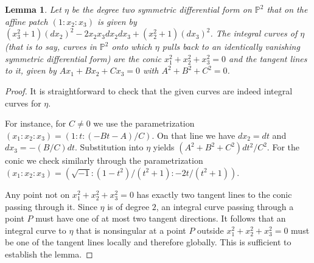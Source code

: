 \documentclass[12pt, reqno]{amsart}
\newtheorem{lemma}{Lemma}[section]
\theoremstyle{definition}
\newcommand{\PP}{{\mathbb P}}
\numberwithin{equation}{section}
\numberwithin{table}{section}
\begin{document}
\begin{lemma}\label{L:integral_curve_classification_on_P2}
	Let $\eta$ be the degree two symmetric differential form on $\PP^2$ that on the affine patch $(1:x_2:x_3)$ is given by $(x_3^2+1)(dx_2)^2-2x_2x_3dx_2dx_3+(x_2^2+1)(dx_3)^2$. The integral curves of $\eta$ (that is to say, curves in $\PP^2$ onto which $\eta$ pulls back to an identically vanishing symmetric differential form) are the conic $x_1^2+x_2^2+x_3^2=0$ and the tangent lines to it, given by $Ax_1+Bx_2+Cx_3=0$ with $A^2+B^2+C^2=0$.
\end{lemma}
\begin{proof}
	It is straightforward to check that the given curves are indeed integral curves for $\eta$.
	
	For instance, for $C\neq 0$ we use the parametrization $(x_1:x_2:x_3)=(1:t:(-Bt-A)/C)$. On that line we have $dx_2=dt$ and $dx_3=-(B/C)dt$. Substitution into $\eta$ yields $(A^2+B^2+C^2)dt^2/C^2$.
	For the conic we check similarly through the parametrization $(x_1:x_2:x_3)=(\sqrt{-1}:(1-t^2)/(t^2+1):-2t/(t^2+1))$.

	Any point not on $x_1^2+x_2^2+x_3^2=0$ has exactly two tangent lines to the conic passing through it. Since $\eta$ is of degree $2$, an integral curve passing through a point $P$ must have one of at most two tangent directions. It follows that an integral curve to $\eta$ that is nonsingular at a point $P$ outside $x_1^2+x_2^2+x_3^2=0$ must be one of the tangent lines locally and therefore globally. This is sufficient to establish the lemma.
\end{proof}
\end{document}
